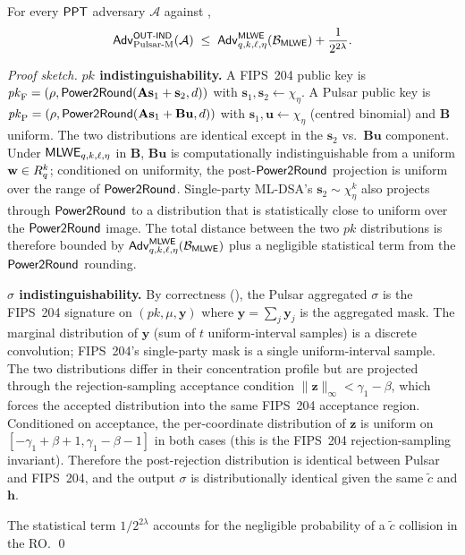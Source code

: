 \begin{theorem}
\label{thm:outind}
For every $\mathsf{PPT}$ adversary $\mathcal{A}$ against ,
\[
\mathsf{Adv}^{\mathsf{OUT\textsf{-}IND}}_{\mathrm{Pulsar\text{-}M}}(\mathcal{A})
\;\le\;
\mathsf{Adv}^{\mathsf{MLWE}}_{q, k, \ell, \eta}(\mathcal{B}_{\mathsf{MLWE}}) +
\frac{1}{2^{2\lambda}}.
\]
\end{theorem}

\begin{proof}[Proof sketch]
\textbf{$\mathit{pk}$ indistinguishability.}
A FIPS~204 public key is $\mathit{pk}_{\mathrm{F}} = (\rho, \mathsf{Power2Round}(\mathbf{A}\mathbf{s}_1 + \mathbf{s}_2, d))$ with $\mathbf{s}_1, \mathbf{s}_2 \gets \chi_\eta$.
A Pulsar public key is $\mathit{pk}_{\mathrm{P}} = (\rho, \mathsf{Power2Round}(\mathbf{A}\mathbf{s}_1 + \mathbf{B}\mathbf{u}, d))$ with $\mathbf{s}_1, \mathbf{u} \gets \chi_\eta$ (centred binomial) and $\mathbf{B}$ uniform.
The two distributions are identical except in the $\mathbf{s}_2$ vs.\ $\mathbf{B}\mathbf{u}$ component. Under $\mathsf{MLWE}_{q, k, \ell, \eta}$ in $\mathbf{B}$, $\mathbf{B}\mathbf{u}$ is computationally indistinguishable from a uniform $\mathbf{w} \in R_q^k$; conditioned on uniformity, the post-$\mathsf{Power2Round}$ projection is uniform over the range of $\mathsf{Power2Round}$. Single-party ML-DSA's $\mathbf{s}_2 \sim \chi_\eta^k$ also projects through $\mathsf{Power2Round}$ to a distribution that is statistically close to uniform over the $\mathsf{Power2Round}$ image. The total distance between the two $\mathit{pk}$ distributions is therefore bounded by $\mathsf{Adv}^{\mathsf{MLWE}}_{q, k, \ell, \eta}(\mathcal{B}_{\mathsf{MLWE}})$ plus a negligible statistical term from the $\mathsf{Power2Round}$ rounding.

\textbf{$\sigma$ indistinguishability.}
By correctness (), the Pulsar aggregated
$\sigma$ is the FIPS~204 signature on $(\mathit{pk}, \mu, \mathbf{y})$ where $\mathbf{y} = \sum_j \mathbf{y}_j$ is the aggregated mask. The marginal distribution of $\mathbf{y}$ (sum of $t$ uniform-interval samples) is a discrete convolution; FIPS~204's single-party mask is a single uniform-interval sample. The two distributions differ in their concentration profile but are projected through the rejection-sampling acceptance condition $\|\mathbf{z}\|_\infty < \gamma_1 - \beta$, which forces the accepted distribution into the same FIPS~204 acceptance region. Conditioned on acceptance, the per-coordinate distribution of $\mathbf{z}$ is uniform on $[-\gamma_1 + \beta + 1, \gamma_1 - \beta - 1]$ in both cases (this is the FIPS~204 rejection-sampling invariant). Therefore the post-rejection distribution is identical between Pulsar and FIPS~204, and the output $\sigma$ is distributionally identical given the same $\tilde c$ and $\mathbf{h}$.

The statistical term $1/2^{2\lambda}$ accounts for the negligible
probability of a $\tilde c$ collision in the RO. \qed
\end{proof}


